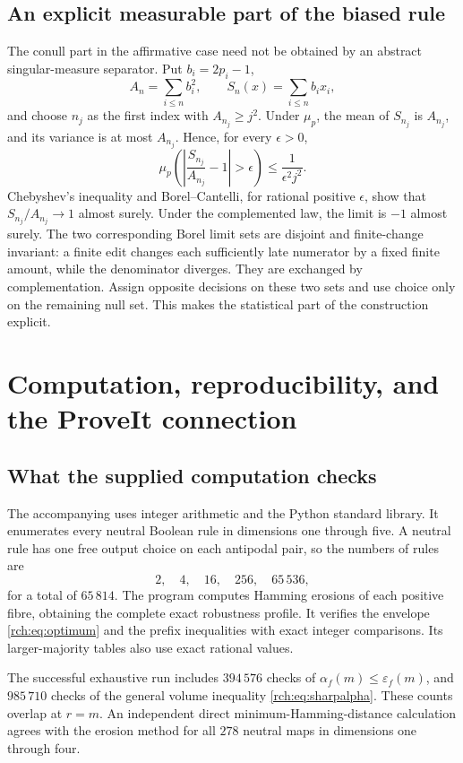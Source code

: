 \documentclass[11pt]{article}
\theoremstyle{definition}
\theoremstyle{remark}
\newcommand{\eps}{\varepsilon}
\newcommand{\code}[1]{\texttt{\detokenize{#1}}}
\begin{document}
\subsection{An explicit measurable part of the biased rule}

The conull part in the affirmative case need not be obtained by an abstract
singular-measure separator. Put \(b_i=2p_i-1\),
\[
 A_n=\sum_{i\le n}b_i^2,\qquad
 S_n(x)=\sum_{i\le n}b_ix_i,
\]
and choose \(n_j\) as the first index with \(A_{n_j}\ge j^2\). Under
\(\mu_p\), the mean of \(S_{n_j}\) is \(A_{n_j}\), and its variance is at
most \(A_{n_j}\). Hence, for every \(\epsilon>0\),
\[
 \mu_p\left(\left|\frac{S_{n_j}}{A_{n_j}}-1\right|>\epsilon\right)
 \le\frac{1}{\epsilon^2j^2}.
\]
Chebyshev's inequality and Borel--Cantelli, for rational positive \(\epsilon\),
show that \(S_{n_j}/A_{n_j}\to1\) almost surely. Under the complemented law,
the limit is \(-1\) almost surely. The two corresponding Borel limit sets are
disjoint and finite-change invariant: a finite edit changes each sufficiently
late numerator by a fixed finite amount, while the denominator diverges.
They are exchanged by complementation. Assign opposite decisions on these
two sets and use choice only on the remaining null set. This makes the
statistical part of the construction explicit.

\section{Computation, reproducibility, and the ProveIt connection}
\label{rch:sec:formal}

\subsection{What the supplied computation checks}

The accompanying \code{code/verify.py} uses integer arithmetic and the Python
standard library. It enumerates every neutral Boolean rule in dimensions one
through five. A neutral rule has one free output choice on each antipodal pair,
so the numbers of rules are
\[
 2,\quad4,\quad16,\quad256,\quad65\,536,
\]
for a total of \(65\,814\). The program computes Hamming erosions of each
positive fibre, obtaining the complete exact robustness profile. It verifies
the envelope \eqref{rch:eq:optimum} and the prefix inequalities with exact integer
comparisons. Its larger-majority tables also use exact rational values.

The successful exhaustive run includes \(394\,576\) checks of
\(\alpha_f(m)\le\eps_f(m)\), and \(985\,710\) checks of the general
volume inequality \eqref{rch:eq:sharpalpha}. These counts overlap at \(r=m\).
An independent direct minimum-Hamming-distance calculation agrees with the
erosion method for all \(278\) neutral maps in dimensions one through four.
\end{document}
